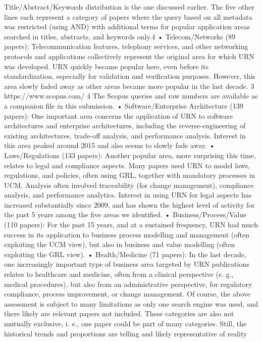 Title/Abstract/Keywords distribution is the one
discussed earlier. The five other lines each represent a category of papers where the query based on
all metadata was restricted (using AND) with additional terms for popular application areas searched
in titles, abstracts, and keywords only.4
• Telecom/Networks (89 papers): Telecommunication features, telephony services, and other
networking protocols and applications collectively represent the original area for which URN
was developed. URN quickly became popular
here, even before its standardization, especially
for validation and verification purposes. However, this area slowly faded away as other areas
became more popular in the last decade.
3 https://www.scopus.com/
4 The Scopus queries and raw numbers are available as a
companion file in this submission.
• Software/Enterprise Architecture (139 papers):
One important area concerns the application of
URN to software architectures and enterprise
architectures, including the reverse-engineering
of existing architectures, trade-off analysis, and
performance analysis. Interest in this area
peaked around 2015 and also seems to slowly
fade away.
• Laws/Regulations (133 papers): Another popular area, more surprising this time, relates
to legal and compliance aspects. Many papers used URN to model laws, regulations,
and policies, often using GRL, together with
mandatory processes in UCM. Analysis often
involved traceability (for change management),
compliance analysis, and performance analytics. Interest in using URN for legal aspects
has increased substantially since 2009, and has
shown the highest level of activity for the past
5 years among the five areas we identified.
• Business/Process/Value (110 papers): For the
past 15 years, and at a sustained frequency,
URN had much success in its application to
business process modelling and management
(often exploiting the UCM view), but also in
business and value modelling (often exploiting
the GRL view).
• Health/Medicine (71 papers): In the last decade,
one increasingly important type of business
area targeted by URN publications relates to
healthcare and medicine, often from a clinical
perspective (e. g., medical procedures), but also
from an administrative perspective, for regulatory compliance, process improvement, or
change management.
Of course, the above assessment is subject to
many limitations as only one search engine was
used, and there likely are relevant papers not included. These categories are also not mutually
exclusive, i. e., one paper could be part of many
categories. Still, the historical trends and proportions are telling and likely representative of reality
